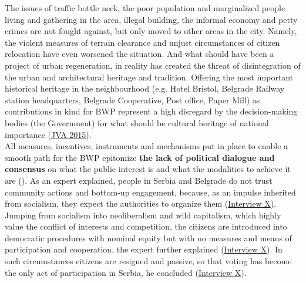 \documentclass[11pt]{report}
\begin{document}
The issues of traffic bottle neck, the poor population and marginalized people living and gathering in the area, illegal building, the informal economy and petty crimes are not fought against, but only moved to other areas in the city. Namely, the violent measures of terrain clearance and unjust circumstances of citizen relocation have even worsened the situation. And what should have been a project of urban regeneration, in reality has created the threat of disintegration of the urban and architectural heritage and tradition. Offering the most important historical heritage in the neighbourhood (e.g. Hotel Bristol, Belgrade Railway station headquarters, Belgrade Cooperative, Post office, Paper Mill) as contributions in kind for BWP represent a high disregard by the decision-making bodies (the Government) for what should be cultural heritage of national importance  (\href{JVA}{JVA 2015}).
\\

All measures, incentives, instruments and mechanisms put in place to enable a smooth path for the BWP epitomize \textbf{the lack of political dialogue and consensus} on what the public interest is and what the modalities to achieve it are 
(\href{Vujosevic}{\cite{vujosevic_post-socialist_2010}}).
As an expert explained, people in Serbia and Belgrade do not trust community actions and bottom-up engagement, because, as an impulse inherited from socialism, they expect the authorities to organize them
(\href{InterviewX}{Interview X}).
Jumping from socialism into neoliberalism and wild capitalism, which highly value the conflict of interests and competition, the citizens are introduced into democratic procedures with nominal equity but with no measures and means of participation and cooperation, the expert further explained (\href{InterviewX}{Interview X}).
In such circumstances citizens are resigned and passive, so that voting has become the only act of participation in Serbia, he concluded (\href{InterviewX}{Interview X}).
\\
\end{document}
